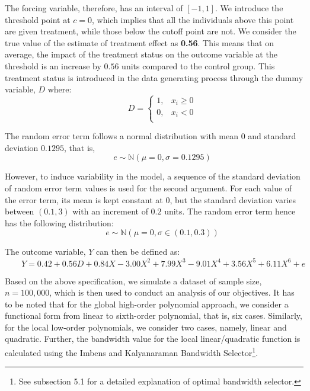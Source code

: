 \documentclass[fleqn]{article}
\begin{document}
    The forcing variable, therefore, has an interval of $\left[-1,1\right]$. We introduce the threshold point at $c = 0$, which implies that all the individuals above this point are given treatment, while those below the cutoff point are not. We consider the true value of the estimate of treatment effect as \textbf{0.56}. This means that on average, the impact of the treatment status on the outcome variable at the threshold is an increase by $0.56$ units compared to the control group. This treatment status is introduced in the data generating process through the dummy variable, $D$ where:\\
    \begin{equation*}
        \qquad D = {\begin{cases}
            1, & x_{i}\geq 0\\
            0, & x_{i} < 0\\
        \end{cases}}
    \end{equation*}

    The random error term follows a normal distribution with mean $0$ and standard deviation $0.1295$, that is,\\
    \begin{equation*}
        \qquad e \sim \mathbb{N}(\mu = 0, \sigma = 0.1295)
    \end{equation*}

    However, to induce variability in the model, a sequence of the standard deviation of random error term values is used for the second argument. For each value of the error term, its mean is kept constant at $0$, but the standard deviation varies between $(0.1,3)$ with an increment of $0.2$ units. The random error term hence has the following distribution:\\
    \begin{equation*}
        \qquad e \sim \mathbb{N}(\mu = 0, \sigma \in (0.1,0.3))
    \end{equation*}

    The outcome variable, $Y$ can then be defined as:\\
    \begin{equation*}
        \qquad Y = 0.42 + 0.56D + 0.84X - 3.00X^{2} + 7.99X^{3} - 9.01X^{4} + 3.56X^{5} + 6.11X^{6} + e
    \end{equation*}

    Based on the above specification, we simulate a dataset of sample size, $n = 100,000$, which is then used to conduct an analysis of our objectives. It has to be noted that for the global high-order polynomial approach, we consider a functional form from linear to sixth-order polynomial, that is, six cases. Similarly, for the local low-order polynomials, we consider two cases, namely, linear and quadratic. Further, the bandwidth value for the local linear/quadratic function is calculated using the Imbens and Kalyanaraman Bandwidth Selector\cite{imbens2012optimal}\footnote{See subsection 5.1 for a detailed explanation of optimal bandwidth selector.}.\\
\end{document}
